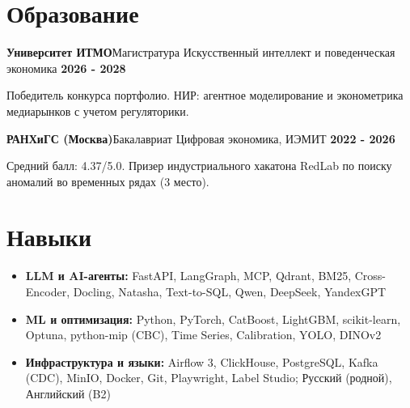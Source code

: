 \documentclass[a4paper,10pt]{article}
\providecommand{\dq}{}
\renewcommand{\dq}{\symbol{34}}
\newcommand{\sep}{\hspace{0.45em}\textbar\hspace{0.45em}}
\begin{document}
\section{Образование}
\noindent\textbf{Университет ИТМО}\sep Магистратура \dq{}Искусственный интеллект и поведенческая экономика\dq{} \hfill \textbf{\color{muted}2026 - 2028}\par
\noindent Победитель конкурса портфолио. НИР: агентное моделирование и эконометрика медиарынков с учетом регуляторики.\par\vspace{2.8pt}
\noindent\textbf{РАНХиГС (Москва)}\sep Бакалавриат \dq{}Цифровая экономика\dq{}, ИЭМИТ \hfill \textbf{\color{muted}2022 - 2026}\par
\noindent Средний балл: 4.37/5.0. Призер индустриального хакатона RedLab по поиску аномалий во временных рядах (3 место).

\section{Навыки}
{\fontsize{8.35pt}{10.1pt}\selectfont
\begin{itemize}[itemsep=1.8pt, topsep=0.7pt]
  \item \textbf{LLM и AI-агенты:} FastAPI, LangGraph, MCP, Qdrant, BM25, \mbox{Cross-Encoder}, Docling, Natasha, \mbox{Text-to-SQL}, Qwen, DeepSeek, YandexGPT
  \item \textbf{ML и оптимизация:} Python, PyTorch, CatBoost, LightGBM, \mbox{scikit-learn}, Optuna, \mbox{python-mip} (CBC), Time Series, Calibration, YOLO, DINOv2
  \item \textbf{Инфраструктура и языки:} Airflow 3, ClickHouse, PostgreSQL, Kafka (CDC), MinIO, Docker, Git, Playwright, Label Studio; Русский (родной), Английский (B2)
\end{itemize}
}
\end{document}
